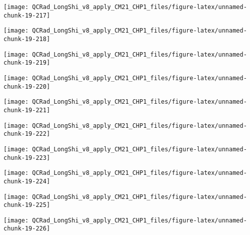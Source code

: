 \documentclass[
  10pt,
  a4paper,oneside]{article}
\begin{document}
\begin{center}\texttt{[image: QCRad\_LongShi\_v8\_apply\_CM21\_CHP1\_files/figure-latex/unnamed-chunk-19-217]} \end{center}

\begin{center}\texttt{[image: QCRad\_LongShi\_v8\_apply\_CM21\_CHP1\_files/figure-latex/unnamed-chunk-19-218]} \end{center}

\begin{center}\texttt{[image: QCRad\_LongShi\_v8\_apply\_CM21\_CHP1\_files/figure-latex/unnamed-chunk-19-219]} \end{center}

\begin{center}\texttt{[image: QCRad\_LongShi\_v8\_apply\_CM21\_CHP1\_files/figure-latex/unnamed-chunk-19-220]} \end{center}

\begin{center}\texttt{[image: QCRad\_LongShi\_v8\_apply\_CM21\_CHP1\_files/figure-latex/unnamed-chunk-19-221]} \end{center}

\begin{center}\texttt{[image: QCRad\_LongShi\_v8\_apply\_CM21\_CHP1\_files/figure-latex/unnamed-chunk-19-222]} \end{center}

\begin{center}\texttt{[image: QCRad\_LongShi\_v8\_apply\_CM21\_CHP1\_files/figure-latex/unnamed-chunk-19-223]} \end{center}

\begin{center}\texttt{[image: QCRad\_LongShi\_v8\_apply\_CM21\_CHP1\_files/figure-latex/unnamed-chunk-19-224]} \end{center}

\begin{center}\texttt{[image: QCRad\_LongShi\_v8\_apply\_CM21\_CHP1\_files/figure-latex/unnamed-chunk-19-225]} \end{center}

\begin{center}\texttt{[image: QCRad\_LongShi\_v8\_apply\_CM21\_CHP1\_files/figure-latex/unnamed-chunk-19-226]} \end{center}
\end{document}
